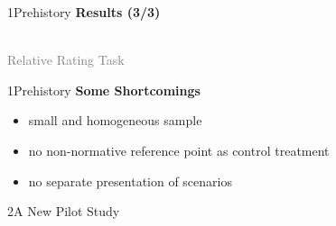 \documentclass[xcolor=table,9pt,aspectratio=169]{beamer}
\begin{document}
\begin{frame}{\vspace*{10mm}1\hspace*{1em}Prehistory}
   \textbf{Results (3/3)}
   \begin{center}
      \\
      \textcolor{gray}{Relative Rating Task}\\
   \end{center}
\end{frame}


\begin{frame}{\vspace*{10mm}1\hspace*{1em}Prehistory}
   \textbf{Some Shortcomings}
   
   \medskip
   \begin{itemize}
      \item small and homogeneous sample
      \item no non-normative reference point as control treatment
      \item no separate presentation of scenarios
   \end{itemize}
\end{frame}


\begin{frame}
   \begin{overlayarea}{\textwidth}{0.81\paperheight}{
      \vspace*{11mm}
      \textcolor{uolblue}
      {2\hspace*{1em}A New Pilot Study}
   }
   \end{overlayarea}
\end{frame}
\end{document}
